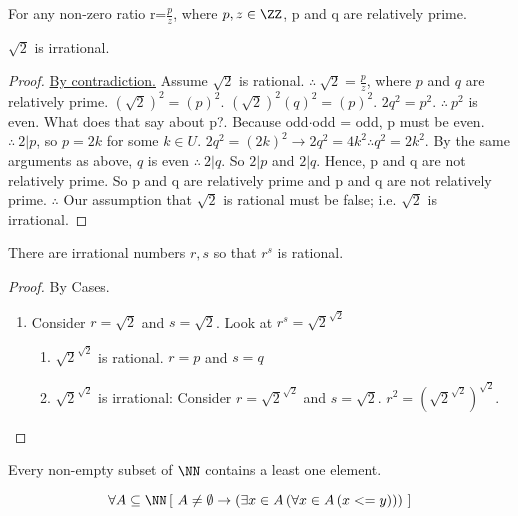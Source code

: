 
\begin{definition}
For any non-zero ratio r=$\frac{p}{z}$, where $p,z \in \ZZ$, p and q are relatively prime.
\end{definition}
\begin{theorem}[Textbook 2.2.2]
$\sqrt{2}$ is irrational.
\end{theorem}
\begin{proof}\underline{By contradiction.} Assume $\sqrt{2}$ is rational. $\therefore \ \sqrt{2} = \frac{p}{z}$, where $p$ and $q$ are relatively prime. $\left( \sqrt{2} \right)^2 = (p)^2$. $\left( \sqrt{2} \right)^2 (q)^2 = (p)^2$. $2q^2 = p^2$. $\therefore\ p^2$ is even. What does that say about p?. Because odd$\cdot$odd = odd, p must be even. $\therefore\ 2|p$, so $p=2k$ for some $k\in U$. $2q^2 = (2k)^2 \to 2q^2 = 4k^2 \therefore q^2 = 2k^2$. By the same arguments as above, $q$ is even $\therefore\ 2|q$. So $2|p$ and $2|q$. Hence, p and q are not relatively prime. So p and q are relatively prime and p and q are not relatively prime. $\therefore$ Our assumption that $\sqrt{2}$ is rational must be false; i.e. $\sqrt{2}$ is irrational.
\end{proof} 
\begin{theorem}
There are irrational  numbers $r,s$ so that $r^s$ is rational.
\end{theorem}
\begin{proof} By Cases.
\begin{enumerate}
\item Consider $r=\sqrt{2}$ and $s=\sqrt{2}$. Look at $r^s=\sqrt{2}^{\sqrt{2}}$
\begin{enumerate}
	\item $\sqrt{2}^{\sqrt{2}}$ is rational. \ck $r=p$ and $s=q$
	\item $\sqrt{2}^{\sqrt{2}}$ is irrational: Consider $r=\sqrt{2}^{\sqrt{2}}$ and $s=\sqrt{2}$. $r^2=\left( \sqrt{2}^{\sqrt{2}}\right)^{\sqrt{2}}$. \ck
\end{enumerate}
\end{enumerate}
\end{proof}
\begin{theorem}
Every non-empty subset of $\NN$ contains a least one element.

\[ \forall A \subseteq \NN \left[\ A \neq \emptyset \to \left( \exists x \in A \left( \forall x \in A \left( x <= y \right) \right)\right)\ \right]\]
\end{theorem}
